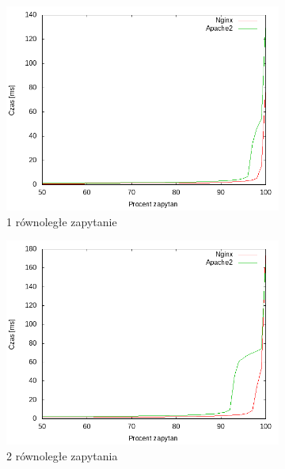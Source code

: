 \begin{figure}
	\centering
	\begin{subfigure}[h]{0.3\textwidth}
		\includegraphics[width=\textwidth]{testy/wybor_index_duzy_1.png}
		\caption{1 równoległe zapytanie}
	\end{subfigure}
	\begin{subfigure}[h]{0.3\textwidth}
		\includegraphics[width=\textwidth]{testy/wybor_index_duzy_2.png}
		\caption{2 równoległe zapytania}
	\end{subfigure}
	\begin{subfigure}[h]{0.3\textwidth}

\end{subfigure}
\end{figure}
